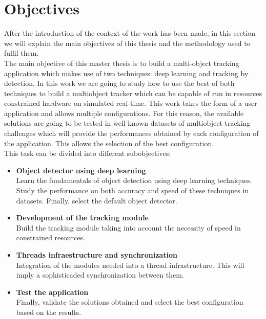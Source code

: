 \section{Objectives}
After the introduction of the context of the work has been made, in this section we will explain the main objectives of this thesis and the methodology used to fulfil them.
\\
The main objective of this master thesis is to build a multi-object tracking application which makes use of two techniques: deep learning and tracking by detection. In this work we are going to study how to use the best of both techniques to build a multiobject tracker which can be capable of run in resources constrained hardware on simulated real-time. This work takes the form of a user application and allows multiple configurations. For this reason, the available solutions are going to be tested in well-known datasets of multiobject tracking challenges which will provide the performances obtained by each configuration of the application. This allows the selection of the best configuration.\\
This task can be divided into different subobjectives:
\begin{itemize}
\item \textbf{Object detector using deep learning}\\
Learn the fundamentals of object detection using deep learning techniques. Study the performance on both accuracy and speed of these techniques in datasets. Finally, select the default object detector.
\item \textbf{Development of the tracking module}\\
Build the tracking module taking into account the necessity of speed in constrained resources.
\item \textbf{Threads infraestructure and synchronization}\\
Integration of the modules needed into a thread infrastructure. This will imply a sophisticaded synchronization between them.
\item \textbf{Test the application}\\
Finally, validate the solutions obtained and select the best configuration based on the results.
\end{itemize}


